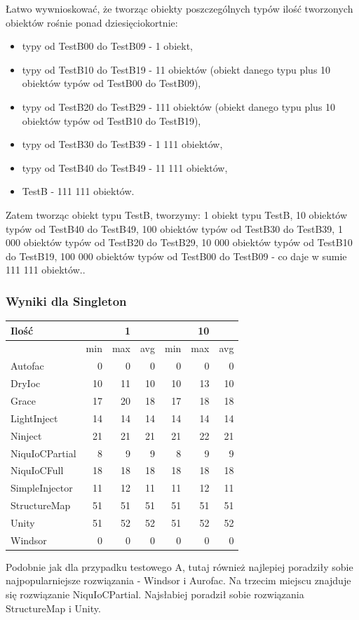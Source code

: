 \documentclass[12pt]{article}
\begin{document}
Łatwo wywnioskować, że tworząc obiekty poszczególnych typów ilość tworzonych obiektów rośnie ponad dziesięciokortnie:
\begin{itemize}
	\item typy od TestB00 do TestB09 - 1 obiekt,
	\item typy od TestB10 do TestB19 - 11 obiektów (obiekt danego typu plus 10 obiektów typów od TestB00 do TestB09),
	\item typy od TestB20 do TestB29 - 111 obiektów (obiekt danego typu plus 10 obiektów typów od TestB10 do TestB19),
	\item typy od TestB30 do TestB39 - 1 111 obiektów,
	\item  typy od TestB40 do TestB49 - 11 111 obiektów,
	\item TestB - 111 111 obiektów.
\end{itemize}
Zatem tworząc obiekt typu TestB, tworzymy: 1 obiekt typu TestB, 10 obiektów typów od TestB40 do TestB49, 100 obiektów typów od TestB30 do TestB39, 1 000 obiektów typów od TestB20 do TestB29, 10 000 obiektów typów od TestB10 do TestB19, 100 000 obiektów typów od TestB00 do TestB09 - co daje w sumie 111 111 obiektów..

\subsubsection{Wyniki dla Singleton}
\begin{center}
\begin{small}
	\begin{tabular}{ | l | r r r | r r r | }
    		\hline
     		Ilość & & 1 & & & 10 &  \\ \hline
     		 & min & max & avg & min & max & avg \\ \hline
		Autofac & 0 & 0 & 0 & 0 & 0 & 0 \\ \hline
		DryIoc & 10 & 11 & 10 & 10 & 13 & 10 \\ \hline
		Grace & 17 & 20 & 18 & 17 & 18 & 18 \\ \hline
		LightInject & 14 & 14 & 14 & 14 & 14 & 14 \\ \hline
		Ninject & 21 & 21 & 21 & 21 & 22 & 21 \\ \hline
		NiquIoCPartial & 8 & 9 & 9 & 8 & 9 & 9 \\ \hline
		NiquIoCFull & 18 & 18 & 18 & 18 & 18 & 18 \\ \hline
		SimpleInjector & 11 & 12 & 11 & 11 & 12 & 11 \\ \hline
		StructureMap & 51 & 51 & 51 & 51 & 51 & 51 \\ \hline
		Unity & 51 & 52 & 52 & 51 & 52 & 52 \\ \hline
		Windsor & 0 & 0 & 0 & 0 & 0 & 0 \\
    		\hline
  	\end{tabular}
\end{small}
\end{center}
Podobnie jak dla przypadku testowego A, tutaj również najlepiej poradziły sobie najpopularniejsze rozwiązania - Windsor i Aurofac. Na trzecim miejscu znajduje się rozwiązanie NiquIoCPartial. Najsłabiej poradził sobie rozwiązania StructureMap i Unity.
\end{document}
